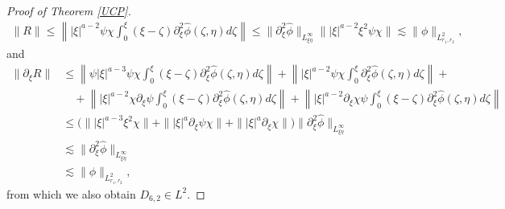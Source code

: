 \documentclass[reqno]{amsart}
\newcommand{\La}{\|\phi\|_{L^2_{r_1,r_2}}}
\newcommand{\p}{\partial}
\numberwithin{equation}{section}
\begin{document}
\begin{proof}[Proof of Theorem \ref{UCP}]
\begin{equation}
\begin{split}
\|R\|\leq \left\| |\xi|^{a-2}\psi \chi\int_0^\xi (\xi-\zeta)\partial_\xi^2 \hat{\phi}(\zeta,\eta)d\zeta\right\|
                            \leq  \|\partial_\xi^2 \hat{\phi}\|_{L^\infty_{\xi \eta}}\||\xi|^{a-2}\xi^2 \psi \chi\|
                            \lesssim \La,
\end{split}
\end{equation}
and
\begin{equation}
\begin{split}\label{pR}
\|\partial_\xi R\|&\leq \left\|\psi|\xi|^{a-3}\psi \chi\int_0^\xi (\xi-\zeta)\partial_\xi^2 \hat{\phi}(\zeta,\eta)d\zeta \right\|+
                     \left\||\xi|^{a-2}\psi\chi\int_0^\xi \partial_\xi^2 \hat{\phi}(\zeta,\eta)d\zeta\right\|+ \\
                    &\quad+\left\||\xi|^{a-2}\chi \p_\xi \psi\int_0^\xi (\xi-\zeta)\partial_\xi^2 \hat{\phi}(\zeta,\eta)d\zeta\right\|+\left\||\xi|^{a-2}\p_\xi\chi\psi\int_0^\xi (\xi-\zeta)\partial_\xi^2 \hat{\phi}(\zeta,\eta)d\zeta\right\|\\
                            &\leq \big(\||\xi|^{a-3}\xi^2 \chi \|+\||\xi|^{a}\p_\xi \psi \chi\|+\| |\xi|^{a}\p_\xi\chi\|\big)\|\partial_\xi^2 \hat{\phi}\|_{L^{\infty}_{\xi\eta}}\\
                            &\lesssim  \|\partial_\xi^2 \hat{\phi}\|_{L^{\infty}_{\xi\eta}}\\
                            &\lesssim \La,
\end{split}
\end{equation}
from which we also obtain $D_{6,2}\in L^2$.


\end{proof}
\end{document}
